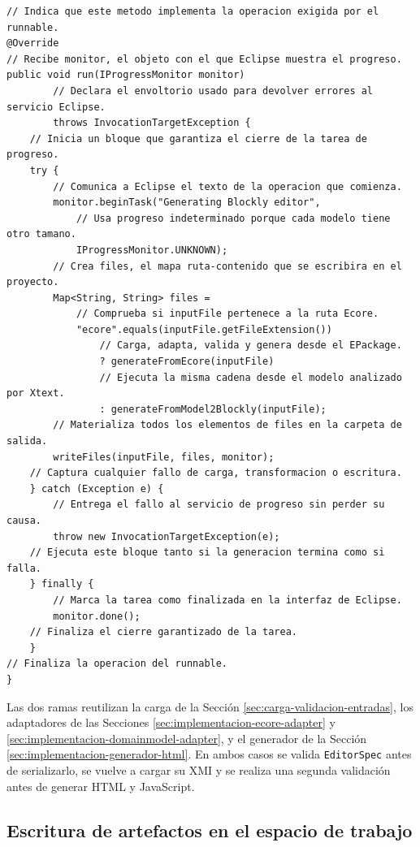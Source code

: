 \begin{lstlisting}[style=tfmjava, caption={Selección de la ruta de generación en Eclipse comentada línea a línea}, label={lst:eclipse-generate-runnable}]
// Indica que este metodo implementa la operacion exigida por el runnable.
@Override
// Recibe monitor, el objeto con el que Eclipse muestra el progreso.
public void run(IProgressMonitor monitor)
        // Declara el envoltorio usado para devolver errores al servicio Eclipse.
        throws InvocationTargetException {
    // Inicia un bloque que garantiza el cierre de la tarea de progreso.
    try {
        // Comunica a Eclipse el texto de la operacion que comienza.
        monitor.beginTask("Generating Blockly editor",
            // Usa progreso indeterminado porque cada modelo tiene otro tamano.
            IProgressMonitor.UNKNOWN);
        // Crea files, el mapa ruta-contenido que se escribira en el proyecto.
        Map<String, String> files =
            // Comprueba si inputFile pertenece a la ruta Ecore.
            "ecore".equals(inputFile.getFileExtension())
                // Carga, adapta, valida y genera desde el EPackage.
                ? generateFromEcore(inputFile)
                // Ejecuta la misma cadena desde el modelo analizado por Xtext.
                : generateFromModel2Blockly(inputFile);
        // Materializa todos los elementos de files en la carpeta de salida.
        writeFiles(inputFile, files, monitor);
    // Captura cualquier fallo de carga, transformacion o escritura.
    } catch (Exception e) {
        // Entrega el fallo al servicio de progreso sin perder su causa.
        throw new InvocationTargetException(e);
    // Ejecuta este bloque tanto si la generacion termina como si falla.
    } finally {
        // Marca la tarea como finalizada en la interfaz de Eclipse.
        monitor.done();
    // Finaliza el cierre garantizado de la tarea.
    }
// Finaliza la operacion del runnable.
}
\end{lstlisting}

Las dos ramas reutilizan la carga de la Sección
\ref{sec:carga-validacion-entradas}, los adaptadores de las Secciones
\ref{sec:implementacion-ecore-adapter} y
\ref{sec:implementacion-domainmodel-adapter}, y el generador de la Sección
\ref{sec:implementacion-generador-html}. En ambos casos se valida
\texttt{EditorSpec} antes de serializarlo, se vuelve a cargar su XMI y se
realiza una segunda validación antes de generar HTML y JavaScript.

\subsection{Escritura de artefactos en el espacio de trabajo}

